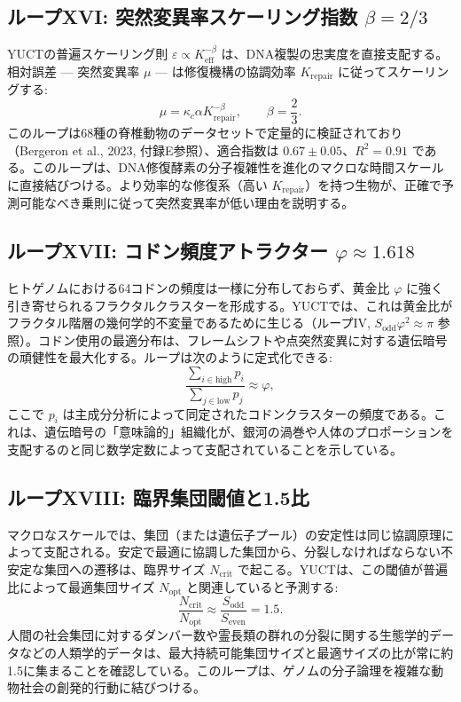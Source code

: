 \documentclass[12pt]{article}
\begin{document}
	\subsection{ループXVI: 突然変異率スケーリング指数 \(\beta = 2/3\)}
	
	YUCTの普遍スケーリング則 \(\varepsilon \propto K_{\mathrm{eff}}^{-\beta}\) は、DNA複製の忠実度を直接支配する。相対誤差 — 突然変異率 \(\mu\) — は修復機構の協調効率 \(K_{\mathrm{repair}}\) に従ってスケーリングする:
	\begin{equation}
		\boxed{ \mu = \kappa_c \alpha K_{\mathrm{repair}}^{-\beta}, \qquad \beta = \frac{2}{3} }.
	\end{equation}
	このループは68種の脊椎動物のデータセットで定量的に検証されており（Bergeron et al., 2023, 付録E参照）、適合指数は \(0.67 \pm 0.05\)、\(R^2 = 0.91\) である。このループは、DNA修復酵素の分子複雑性を進化のマクロな時間スケールに直接結びつける。より効率的な修復系（高い \(K_{\mathrm{repair}}\)）を持つ生物が、正確で予測可能なべき乗則に従って突然変異率が低い理由を説明する。
	
	\subsection{ループXVII: コドン頻度アトラクター \(\varphi \approx 1.618\)}
	
	ヒトゲノムにおける64コドンの頻度は一様に分布しておらず、黄金比 \(\varphi\) に強く引き寄せられるフラクタルクラスターを形成する。YUCTでは、これは黄金比がフラクタル階層の幾何学的不変量であるために生じる（ループIV, \(S_{\mathrm{odd}}\varphi^2 \approx \pi\) 参照）。コドン使用の最適分布は、フレームシフトや点突然変異に対する遺伝暗号の頑健性を最大化する。ループは次のように定式化できる:
	\begin{equation}
		\boxed{ \frac{\sum_{i \in \text{high}} p_i}{\sum_{j \in \text{low}} p_j} \approx \varphi },
	\end{equation}
	ここで \(p_i\) は主成分分析によって同定されたコドンクラスターの頻度である。これは、遺伝暗号の「意味論的」組織化が、銀河の渦巻や人体のプロポーションを支配するのと同じ数学定数によって支配されていることを示している。
	
	\subsection{ループXVIII: 臨界集団閾値と1.5比}
	
	マクロなスケールでは、集団（または遺伝子プール）の安定性は同じ協調原理によって支配される。安定で最適に協調した集団から、分裂しなければならない不安定な集団への遷移は、臨界サイズ \(N_{\mathrm{crit}}\) で起こる。YUCTは、この閾値が普遍比によって最適集団サイズ \(N_{\mathrm{opt}}\) と関連していると予測する:
	\begin{equation}
		\boxed{ \frac{N_{\mathrm{crit}}}{N_{\mathrm{opt}}} \approx \frac{S_{\mathrm{odd}}}{S_{\mathrm{even}}} = 1.5 }.
	\end{equation}
	人間の社会集団に対するダンバー数や霊長類の群れの分裂に関する生態学的データなどの人類学的データは、最大持続可能集団サイズと最適サイズの比が常に約1.5に集まることを確認している。このループは、ゲノムの分子論理を複雑な動物社会の創発的行動に結びつける。
	
\end{document}
